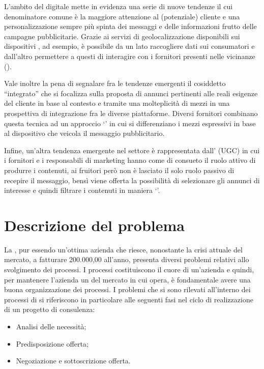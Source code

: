 L'ambito del \mktg digitale mette in evidenza una serie di nuove tendenze il cui denominatore comune è la maggiore attenzione al (potenziale) cliente e una personalizzazione sempre più spinta dei messaggi e delle informazioni frutto delle campagne pubblicitarie. Grazie ai servizi di geolocalizzazione disponibili sui dispositivi , ad esempio, è possibile da un lato raccogliere dati sui consumatori e dall'altro permettere a questi di interagire con i fornitori presenti nelle vicinanze ().

Vale inoltre la pena di segnalare fra le tendenze emergenti il cosiddetto ``\mktg integrato'' che si focalizza sulla proposta di annunci pertinenti alle reali esigenze del cliente in base al contesto e tramite una molteplicità di mezzi in una prospettiva di integrazione fra le diverse piattaforme. Diversi fornitori combinano questa tecnica ad un approccio `' in cui si differenziano i mezzi espressivi in base al dispositivo che veicola il messaggio pubblicitario.

Infine, un'altra tendenza emergente nel settore è rappresentata dall' (UGC) in cui i fornitori e i responsabili di marketing hanno come di consueto il ruolo attivo di produrre i contenuti,  ai fruitori però non è lasciato il solo ruolo passivo di recepire il messaggio, bensì viene offerta la possibilità di selezionare gli annunci di interesse e quindi filtrare i contenuti in maniera `'.



\section{Descrizione del problema}
La \customer , pur essendo un'ottima azienda che riesce, nonostante la crisi attuale del mercato, a fatturare  200.000,00 \text{\euro} all'anno, presenta diversi problemi relativi allo svolgimento dei processi.
I processi costituiscono il cuore di un'azienda e quindi, per mantenere l'azienda un  del mercato in cui opera, è fondamentale avere una buona organizzazione dei processi.
I problemi che si sono rilevati all'interno dei processi di \customer si riferiscono in particolare alle seguenti fasi nel ciclo di realizzazione di un progetto di consulenza:
\begin{itemize}
	\item Analisi delle necessità;
	\item Predisposizione offerta;
	\item Negoziazione e sottoscrizione offerta.
\end{itemize}

